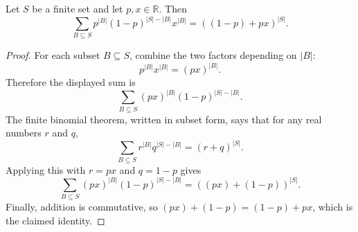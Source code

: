 \begin{helper}
Let \(S\) be a finite set and let \(p,x\in\mathbb R\).  Then
\[
\sum_{B\subseteq S}p^{|B|}(1-p)^{|S|-|B|}x^{|B|}
=((1-p)+px)^{|S|}.
\]
\end{helper}
\begin{proof}
For each subset \(B\subseteq S\), combine the two factors depending on
\(|B|\):
\[
p^{|B|}x^{|B|}=(px)^{|B|}.
\]
Therefore the displayed sum is
\[
\sum_{B\subseteq S}(px)^{|B|}(1-p)^{|S|-|B|}.
\]
The finite binomial theorem, written in subset form, says that for any real
numbers \(r\) and \(q\),
\[
\sum_{B\subseteq S}r^{|B|}q^{|S|-|B|}=(r+q)^{|S|}.
\]
Applying this with \(r=px\) and \(q=1-p\) gives
\[
\sum_{B\subseteq S}(px)^{|B|}(1-p)^{|S|-|B|}
=((px)+(1-p))^{|S|}.
\]
Finally, addition is commutative, so \((px)+(1-p)=(1-p)+px\), which is the
claimed identity.
\end{proof}
